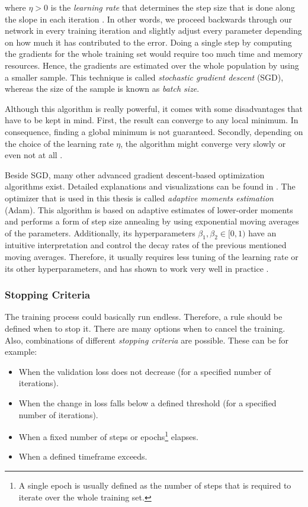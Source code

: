 where $ \eta > 0 $ is the \textit{learning rate} that determines the step size that is done along the slope in each iteration \parencite{pattern_and_ml}. In other words, we proceed backwards through our network in every training iteration and slightly adjust every parameter depending on how much it has contributed to the error. Doing a single step by computing the gradients for the whole training set would require too much time and memory resources. Hence, the gradients are estimated over the whole population by using a smaller sample. This technique is called \textit{stochastic gradient descent} (SGD), whereas the size of the sample is known as \textit{batch size}.

Although this algorithm is really powerful, it comes with some disadvantages that have to be kept in mind. First, the result can converge to any local minimum. In consequence, finding a global minimum is not guaranteed. Secondly, depending on the choice of the learning rate $ \eta $, the algorithm might converge very slowly or even not at all \parencite{ann}.

Beside SGD, many other advanced gradient descent-based optimization algorithms exist. Detailed explanations  and visualizations can be found in \parencite{optimization}. The optimizer that is used in this thesis is called \textit{adaptive moments estimation} (Adam). This algorithm is based on adaptive estimates of lower-order moments and performs a form of step size annealing by using exponential moving averages of the parameters. Additionally, its hyperparameters $ \beta_1, \beta_2 \in [0, 1) $ have an intuitive interpretation and control the decay rates of the previous mentioned moving averages. Therefore, it usually requires less tuning of the learning rate or its other hyperparameters, and has shown to work very well in practice \parencite{adam}.


\subsubsection{Stopping Criteria}

The training process could basically run endless. Therefore, a rule should be defined when to stop it. There are many options when to cancel the training. Also, combinations of different \textit{stopping criteria} are possible. These can be for example:

\begin{itemize}
\item When the validation loss does not decrease (for a specified number of iterations).
\item When the change in loss falls below a defined threshold (for a specified number of iterations).
\item When a fixed number of steps or epochs\footnote{A single epoch is usually defined as the number of steps that is required to iterate over the whole training set.} elapses.
\item When a defined timeframe exceeds.
\end{itemize}


